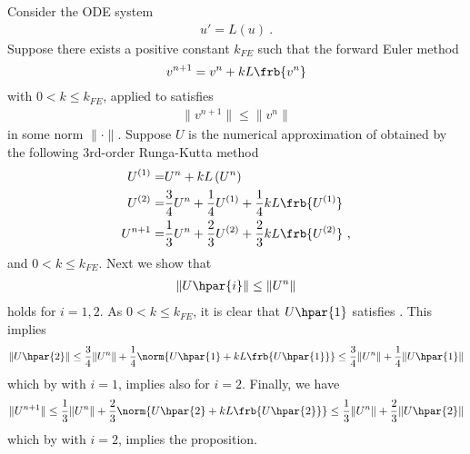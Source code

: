\documentclass{article}
\begin{document}
\begin{exerciseList}
\item
Consider the ODE system
\begin{gather} \label{odeSys}
	u'=L(u)\ .
\end{gather}
Suppose there exists a positive constant $k_{FE}$ such that the forward Euler method
$$
	v^{n+1}=v^n+kL\frb{v^n}
$$
with $0< k\le k_{FE}$, applied to  satisfies
\begin{gather} \label{stabEst}
	\|v^{n+1}\|\le\|v^n\|
\end{gather}
in some norm $\|\cdot\|$.
Suppose $U$ is the numerical approximation of  obtained by the following 3rd-order Runga-Kutta method
\begin{align*}
	U^{\left(1\right)}= & U^{n}+kL\left(U^{n}\right)\\
	U^{\left(2\right)}= & \frac{3}{4}U^{n}+\frac{1}{4}U^{\left(1\right)}+\frac{1}{4}kL\frb{U^{\left(1\right)}}\\
	U^{n+1}= & \frac{1}{3}U^{n}+\frac{2}{3}U^{\left(2\right)}+\frac{2}{3}kL\frb{U^{\left(2\right)}}\ ,
\end{align*}
and $0< k\le k_{FE}$. Next we show that
\begin{gather} \label{estUi}
	\|U\hpar{i}\|\le\|U^n\|
\end{gather}
holds for $i=1,2$.
As $0<k\le k_{FE}$, it is clear that $U\hpar{1}$ satisfies .
This implies
\begin{gather}
	\|U\hpar{2}\|\le \frac{3}{4}\|U^n\| +\frac{1}{4}\norm{U\hpar{1} +kL\frb{U\hpar{1}}}
		\le \frac{3}{4}\|U^n\| +\frac{1}{4}\|U\hpar{1}\|
\end{gather}
which by  with $i=1$, implies  also for $i=2$.
Finally, we have
\begin{gather}
	\|U^{n+1}\|\le \frac{1}{3}\|U^n\| +\frac{2}{3}\norm{U\hpar{2} +kL\frb{U\hpar{2}}}
		\le \frac{1}{3}\|U^n\| +\frac{2}{3}\|U\hpar{2}\|
\end{gather}
which by  with $i=2$, implies the proposition.

\end{exerciseList}
\end{document}
